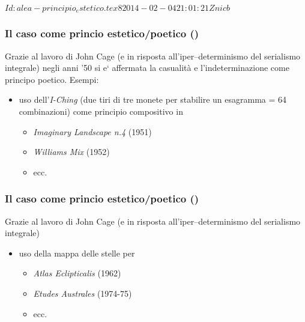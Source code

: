 %
%
\svnInfo $Id: alea-principio_estetico.tex 8 2014-02-04 21:01:21Z nicb $

\setcounter{ms}{0}
\begin{frame}
    \frametitle{Il caso come princio estetico/poetico ()}

    Grazie al lavoro di John Cage (e in risposta all'iper--determinismo del serialismo integrale)
    negli anni '50 si e` affermata la casualit\`a e l'indeterminazione
    come principo poetico.  Esempi:

    \begin{itemize}

    \item uso dell'\emph{I-Ching}
        (due tiri di tre monete per stabilire un esagramma = 64 combinazioni)
        come principio compositivo in

        \begin{itemize}

            \item \emph{Imaginary Landscape n.4} (1951)

            \item \emph{Williams Mix} (1952)

            \item ecc.

        \end{itemize}

    \end{itemize}

\end{frame}

\begin{frame}
    \frametitle{Il caso come princio estetico/poetico ()}

    Grazie al lavoro di John Cage (e in risposta all'iper--determinismo del serialismo integrale)

    \begin{itemize}

       \item uso della mappa delle stelle per

        \begin{itemize}

            \item \emph{Atlas Eclipticalis} (1962)

            \item \emph{Etudes Australes} (1974-75)

            \item ecc.

        \end{itemize}

    \end{itemize}

\end{frame}
